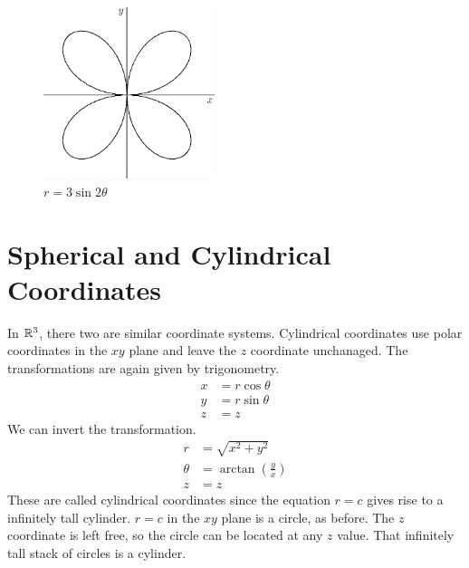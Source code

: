 \documentclass[fleqn,letterpaper]{report}
\begin{document}
\begin{figure}[t]
\centering
\includegraphics[width=5cm]{figure30.eps}
\caption{$r = 3 \sin 2 \theta$}
\label{figure-polar-locus4}
\end{figure}

\section{Spherical and Cylindrical Coordinates}
\label{spherical-cylindrical}

In $\mathbb{R}^3$, there two are similar coordinate systems.
Cylindrical coordinates use polar coordinates in the $xy$
plane and leave the $z$ coordinate unchanaged. The
transformations are again given by trigonometry. 
\begin{align*}
x & = r \cos \theta \\
y & = r \sin \theta \\
z & = z
\end{align*}
We can invert the transformation.
\begin{align*}
r & = \sqrt{x^2 + y^2} \\
\theta & = \arctan \left( \frac{y}{x} \right) \\
z & = z
\end{align*}
These are called cylindrical coordinates since the equation $r=c$
gives rise to a infinitely tall cylinder. $r=c$ in the $xy$
plane is a circle, as before. The $z$ coordinate is left free, so
the circle can be located at any $z$ value. That infinitely
tall stack of circles is a cylinder.
\end{document}
